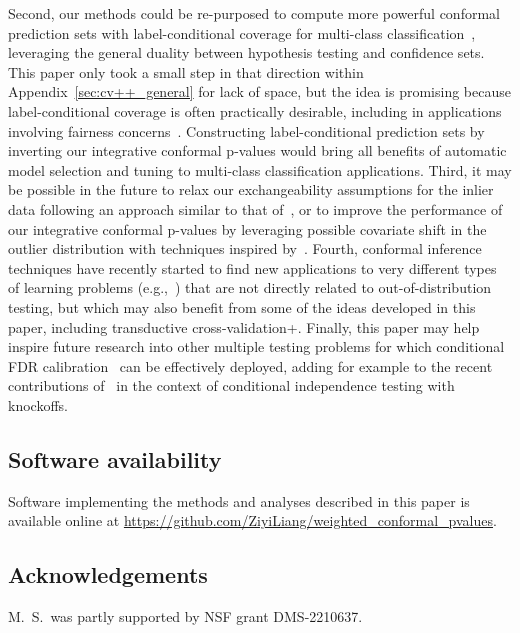 \documentclass[11pt]{article}
\begin{document}
Second, our methods could be re-purposed to compute more powerful conformal prediction sets with label-conditional coverage for multi-class classification~\cite{vovk2003mondrian,romano2020classification}, leveraging the general duality between hypothesis testing and confidence sets.
This paper only took a small step in that direction within Appendix~\ref{sec:cv++_general} for lack of space, but the idea is promising because label-conditional coverage is often practically desirable, including in applications involving fairness concerns~\cite{romano2019malice,rava2021burden}. Constructing label-conditional prediction sets by inverting our integrative conformal p-values would bring all benefits of automatic model selection and tuning to multi-class classification applications.
Third, it may be possible in the future to relax our exchangeability assumptions for the inlier data following an approach similar to that of~\cite{barber2022conformal}, or to improve the performance of our integrative conformal p-values by leveraging possible covariate shift in the outlier distribution with techniques inspired by~\cite{tibshirani2019conformal}.
Fourth, conformal inference techniques have recently started to find new applications to very different types of learning problems (e.g.,~\cite{angelopoulos2022image,sesia2022conformalized,angelopoulos2022conformal}) that are not directly related to out-of-distribution testing, but which may also benefit from some of the ideas developed in this paper, including transductive cross-validation+.
Finally, this paper may help inspire future research into other multiple testing problems for which conditional FDR calibration~\cite{2020conditionalcalibration} can be effectively deployed, adding for example to the recent contributions of~\cite{luo2022improving} in the context of conditional independence testing with knockoffs.


\subsection*{Software availability}

Software implementing the methods and analyses described in this paper is available online at
\url{https://github.com/ZiyiLiang/weighted_conformal_pvalues}.

\subsection*{Acknowledgements}

M.~S.~was partly supported by NSF grant DMS-2210637.
\end{document}
